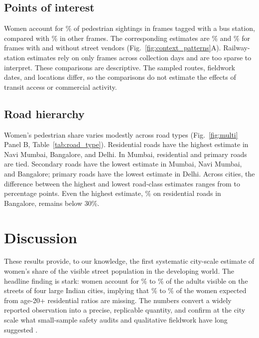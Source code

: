 \documentclass[12pt]{article}
\begin{document}
\subsection{Points of interest}

Women account for \BusStationPresentShare\% of pedestrian sightings in frames tagged with a bus station, compared with \BusStationAbsentShare\% in other frames. The corresponding estimates are \StreetVendorPresentShare\% and \StreetVendorAbsentShare\% for frames with and without street vendors (Fig.~\ref{fig:context_patterns}A). Railway-station estimates rely on only \RailwayStationImages{} frames across \RailwayStationClusters{} collection days and are too sparse to interpret. These comparisons are descriptive. The sampled routes, fieldwork dates, and locations differ, so the comparisons do not estimate the effects of transit access or commercial activity.

\subsection{Road hierarchy}

Women's pedestrian share varies modestly across road types (Fig.~\ref{fig:multi} Panel B, Table~\ref{tab:road_type}). Residential roads have the highest estimate in Navi Mumbai, Bangalore, and Delhi. In Mumbai, residential and primary roads are tied. Secondary roads have the lowest estimate in Mumbai, Navi Mumbai, and Bangalore; primary roads have the lowest estimate in Delhi. Across cities, the difference between the highest and lowest road-class estimates ranges from \MinRoadTypeSpreadPP{} to \MaxRoadTypeSpreadPP{} percentage points. Even the highest estimate, \MaxRoadTypeShare\% on residential roads in Bangalore, remains below 30\%.

\section{Discussion}

These results provide, to our knowledge, the first systematic city-scale estimate of women's share of the visible street population in the developing world. The headline finding is stark: women account for \MinAllModeShare\% to \MaxAllModeShare\% of the adults visible on the streets of four large Indian cities, implying that \MinStreetShortfall\% to \MaxStreetShortfall\% of the women expected from age-20+ residential ratios are missing. The numbers convert a widely reported observation into a precise, replicable quantity, and confirm at the city scale what small-sample safety audits and qualitative fieldwork have long suggested \citep{jagori2010, phadke2011}.
\end{document}
